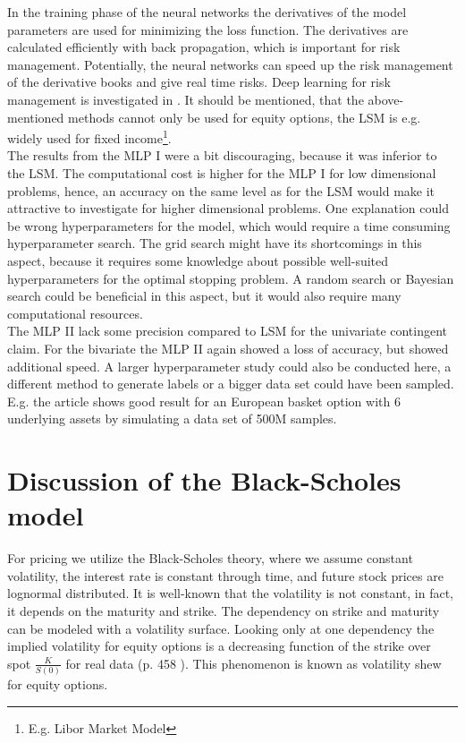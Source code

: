 In the training phase of the neural networks the derivatives of the model parameters are used for minimizing the loss function. The derivatives are calculated efficiently with back propagation, which is important for risk management. Potentially, the neural networks can speed up the risk management of the derivative books and give real time risks. Deep learning for risk management is investigated in \parencite{AntoineSavine}. It should be mentioned, that the above-mentioned methods cannot only be used for equity options, the LSM is e.g. widely used for fixed income\footnote{E.g. Libor Market Model}.\\

The results from the MLP I were a bit discouraging, because it was inferior to the LSM. The computational cost is higher for the MLP I for low dimensional problems, hence, an accuracy on the same level as for the LSM would make it attractive to investigate for higher dimensional problems. One explanation could be wrong hyperparameters for the model, which would require a time consuming hyperparameter search. The grid search might have its shortcomings in this aspect, because it requires some knowledge about possible well-suited hyperparameters for the optimal stopping problem. A random search or Bayesian search could be beneficial in this aspect, but it would also require many computational resources.\\

The MLP II lack some precision compared to LSM for the univariate contingent claim. For the bivariate the MLP II again showed a loss of accuracy, but showed additional speed. A larger hyperparameter study could also be conducted here, a different method to generate labels or a bigger data set could have been sampled. E.g. the article \parencite{FergusonRyan2018} shows good result for an European basket option with 6 underlying assets by simulating a data set of 500M samples. 

\section{Discussion of the Black-Scholes model}
For pricing we utilize the Black-Scholes theory, where we assume constant volatility, the interest rate is constant through time, and future stock prices are lognormal distributed. It is well-known that the volatility is not constant, in fact, it depends on the maturity and strike. The dependency on strike and maturity can be modeled with a volatility surface. Looking only at one dependency the implied volatility for equity options is a decreasing function of the strike over spot $\frac{K}{S(0)}$ for real data (p. 458 \parencite{Hull}). This phenomenon is known as volatility shew for equity options. \\

